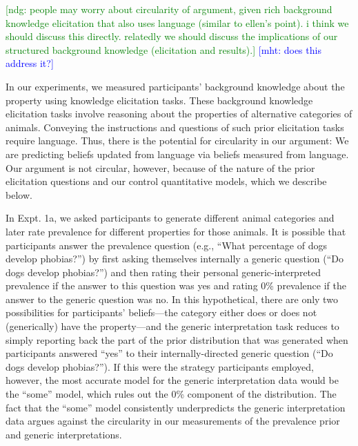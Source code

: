 \documentclass[floatsintext,doc]{apa6}
\begin{document}
{\textcolor{Green}{[ndg: people may worry about circularity of argument, given rich background knowledge elicitation that also uses language (similar to ellen's point). i think we should discuss this directly. relatedly we should discuss the implications of our structured background knowledge (elicitation and results).]}}
{\textcolor{Blue}{[mht: does this address it?]}}

In our experiments, we measured participants' background knowledge about the property using knowledge elicitation tasks.
These background knowledge elicitation tasks involve reasoning about the properties of alternative categories of animals.
Conveying the instructions and questions of such prior elicitation tasks require language.
Thus, there is the potential for circularity in our argument: We are predicting beliefs updated from language via beliefs measured from language.
Our argument is not circular, however, because of the nature of the prior elicitation questions and our control quantitative models, which we describe below.

In Expt. 1a, we asked participants to generate different animal categories and later rate prevalence for different properties for those animals.
It is possible that participants answer the prevalence question (e.g., \enquote{What percentage of dogs develop phobias?}) by first asking themselves internally a generic question (\enquote{Do dogs develop phobias?}) and then rating their personal generic-interpreted prevalence if the answer to this question was yes and rating 0\% prevalence if the answer to the generic question was no.
In this hypothetical, there are only two possibilities for participants' beliefs---the category either does or does not (generically) have the property---and the generic interpretation task reduces to simply reporting back the part of the prior distribution that was generated when participants answered \enquote{yes} to their internally-directed generic question (\enquote{Do dogs develop phobias?}).
If this were the strategy participants employed, however, the most accurate model for the generic interpretation data would be the \enquote{some} model, which rules out the 0\% component of the distribution.
The fact that the \enquote{some} model consistently underpredicts the generic interpretation data argues against the circularity in our measurements of the prevalence prior and generic interpretations.
\end{document}
